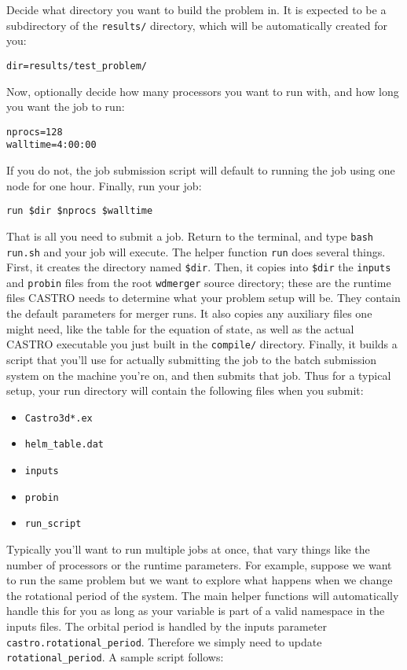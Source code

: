 \documentclass[12pt]{book}
\begin{document}
Decide what directory you want to build the problem in. It is expected 
to be a subdirectory of the \texttt{results/} directory, which will be
automatically created for you:
\begin{lstlisting}
dir=results/test_problem/
\end{lstlisting}
Now, optionally decide how many processors you want to run with, and 
how long you want the job to run:
\begin{lstlisting}
nprocs=128
walltime=4:00:00
\end{lstlisting}
If you do not, the job submission script will default to running the job
using one node for one hour. Finally, run your job:
\begin{lstlisting}
run $dir $nprocs $walltime
\end{lstlisting}%
That is all you need to submit a job. Return to the terminal, and type \texttt{bash run.sh}
and your job will execute. The helper function \texttt{run} does several things. First, 
it creates the directory named \texttt{\$dir}. Then, it copies into \texttt{\$dir} the \texttt{inputs}
and \texttt{probin} files from the root \texttt{wdmerger} source directory; these are the runtime
files CASTRO needs to determine what your problem setup will be. They contain the default 
parameters for merger runs. It also copies any auxiliary files one might need, like the 
table for the equation of state, as well as the actual CASTRO executable you just built in the 
\texttt{compile/} directory. Finally, it builds a script that you'll use for actually submitting 
the job to the batch submission system on the machine you're on, and then submits that job. 
Thus for a typical setup, your run directory will contain the following files when you submit:
\begin{itemize}
  \item \texttt{Castro3d*.ex}
  \item \texttt{helm\_table.dat}
  \item \texttt{inputs}
  \item \texttt{probin}
  \item \texttt{run\_script}
\end{itemize}
Typically you'll want to run multiple jobs at once, that vary things like the number of processors 
or the runtime parameters. For example, suppose we want to run the same problem but we want to 
explore what happens when we change the rotational period of the system. The main helper functions 
will automatically handle this for you as long as your variable is part of a valid namespace in the inputs files.
The orbital period is handled by the inputs parameter \texttt{castro.rotational\_period}. Therefore 
we simply need to update \texttt{rotational\_period}. A sample script follows:
\end{document}
